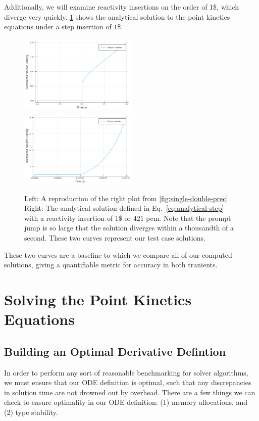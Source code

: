 \documentclass[review,onefignum,onetabnum]{siamart171218}
\begin{document}
Additionally, we will examine reactivity insertions on the order of $1$\$, which
diverge very quickly. \cref{fig:dollar-insert-analytical} shows the analytical
solution to the point kinetics equations under a step insertion of $1$\$.\\

\begin{figure}[htb]
  \includegraphics[width=0.5\textwidth]{../plots/analytical-sols/100pcm.png}
  \includegraphics[width=0.5\textwidth]{../plots/analytical-sols/421pcm.png}
  \caption{Left: A reproduction of the right plot from \cref{fig:single-double-prec}.
  Right: The analytical solution defined in Eq.~\cref{eq:analytical-step} with a
  reactivity insertion of $1$\$ or $421$ pcm. Note that the prompt jump is so large that the
  solution diverges within a thousandth of a second. These two curves represent our
  test case solutions.}
  \label{fig:dollar-insert-analytical}
\end{figure}

These two curves are a baseline to which we compare all of our computed solutions,
giving a quantifiable metric for accuracy in both tranients.

\section{Solving the Point Kinetics Equations}

\subsection{Building an Optimal Derivative Defintion}
In order to perform any sort of reasonable benchmarking for solver algorithms,
we must ensure that our ODE definition is optimal, such that any discrepancies in
solution time are not drowned out by overhead. There are a few things we can check
to ensure optimality in our ODE definition: (1) memory allocations, and (2) type stability. \\
\end{document}

